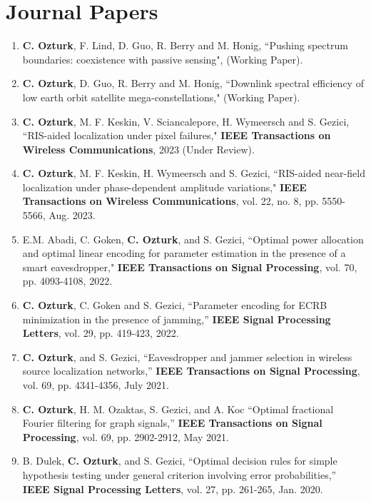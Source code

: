 \section{Journal Papers}
\begin{enumerate}
	\item{{\bf C. Ozturk}, F. Lind, D. Guo, R. Berry and M. Honig, ``{Pushing spectrum boundaries: coexistence with passive sensing}", (Working Paper).	}
	\item{{\bf C. Ozturk}, D. Guo, R. Berry and M. Honig, ``{Downlink spectral efficiency of low earth orbit satellite mega-constellations}," (Working Paper).	}
	
	\item {\bf C. Ozturk}, M. F. Keskin, V. Sciancalepore, H. Wymeersch and S. Gezici, ``{RIS-aided localization under pixel failures}," {\bf IEEE Transactions on Wireless Communications}, 2023 (Under Review).	
	
	\item {\bf C. Ozturk}, M. F. Keskin, H. Wymeersch and S. Gezici, ``{RIS-aided near-field localization under phase-dependent amplitude variations}," {\bf IEEE Transactions on Wireless Communications}, vol. 22, no. 8, pp. 5550-5566, Aug. 2023.	
	
	
	\item E.M. Abadi, C. Goken, {\bf C. Ozturk},  and S. Gezici, ``{Optimal power allocation and optimal linear encoding for parameter estimation in the presence of a smart eavesdropper}," {\bf IEEE Transactions on Signal Processing}, vol. 70, pp. 4093-4108, 2022.	
	
	\item {\bf C. Ozturk}, C. Goken and S. Gezici, ``{Parameter encoding for ECRB minimization in the presence of jamming},'' {\bf IEEE Signal Processing Letters}, vol. 29, pp. 419-423, 2022. 
	
	
	\item  {\bf C. Ozturk},  and S. Gezici, ``{Eavesdropper and jammer selection in wireless source localization networks},'' {\bf IEEE Transactions on Signal Processing}, vol. 69, pp. 4341-4356, July 2021. 
	
	\item {\bf C. Ozturk}, H. M. Ozaktas, S. Gezici, and A. Koc ``{Optimal fractional Fourier filtering for graph signals},'' {\bf IEEE Transactions on Signal Processing}, vol. 69, pp. 2902-2912, May 2021. 
	
	\item B. Dulek, {\bf C. Ozturk},  and S. Gezici, ``{Optimal decision rules for simple hypothesis  testing under general criterion involving error probabilities},'' {\bf IEEE Signal Processing Letters}, vol. 27, pp. 261-265, Jan. 2020. 
	

\end{enumerate}
